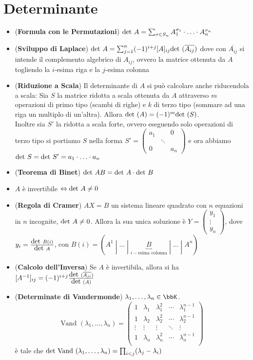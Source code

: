 \documentclass[a4paper,NoNotes,GeneralMath]{stdmdoc}
\newcommand{\Vand}{\mbox{Vand }}
\begin{document}
	\section*{Determinante}
	\begin{itemize}
		\item ({\bf Formula con le Permutazioni}) $\mbox{det } A = \sum_{\sigma \in S_n} A_1^{\sigma_1} \cdot \ldots \cdot A_n^{\sigma_n}$
		\item ({\bf Sviluppo di Laplace}) $\mbox{det } A = \sum_{j=1}^{n} (-1)^{i+j} [A]_{ij} \mbox{det }(\overline{A_{ij}})$ dove con $\overline{A_{ij}}$ si intende il complemento algebrico di $A_{ij}$, ovvero la matrice ottenuta da $A$ togliendo la $i$-esima riga e la $j$-esima colonna
		\item ({\bf Riduzione a Scala}) Il determinante di $A$ si può calcolare anche riducendola a scala: Sia $S$ la matrice ridotta a scala ottenuta da $A$ attraverso $m$ operazioni di primo tipo (scambi di righe) e $k$ di terzo tipo (sommare ad una riga un multiplo di un'altra). Allora $\mbox{det }(A) = (-1)^{m} \mbox{det }(S)$. \\ Inoltre sia $S'$ la ridotta a scala forte, ovvero eseguendo solo operazioni di terzo tipo si portiamo $S$ nella forma $S' = \left( \begin{array}{ccc} a_1 & & 0 \\ & \ddots & \\ 0 & & a_n \end{array} \right)$ e ora abbiamo $\mbox{det } S = \mbox{det } S' = a_1 \cdot \ldots \cdot a_n$
		\item ({\bf Teorema di Binet}) $\mbox{det } AB = \mbox{det } A \cdot \mbox{det } B$
		\item $A$ è invertibile $\Leftrightarrow \mbox{det } A \neq 0$
		\item ({\bf Regola di Cramer}) $AX = B$ un sistema lineare quadrato con $n$ equazioni in $n$ incognite, $\mbox{det } A \neq 0$. Allora la sua unica soluzione è $Y = \left( \begin{array}{c} y_1 \\ \vdots \\ y_n \end{array} \right)$, dove $y_i = \frac{\mbox{det } B(i)}{\mbox{det } A}$, con $B(i) = \left( A^{1} \middle| \ldots \middle| \underbrace{B}_{i-\text{esima colonna}} \middle| \ldots \middle| A^{n} \right)$
		\item ({\bf Calcolo dell'Inversa}) Se $A$ è invertibila, allora si ha $[A^{-1}]_{ij} = (-1)^{i+j} \frac{\mbox{det } (\overline{A_{ji}})}{\mbox{det } (A)}$
		\item ({\bf Determinate di Vandermonde}) $\lambda_1, \ldots, \lambda_n \in \bbK$. $$\Vand(\lambda_1, \ldots, \lambda_n) = \left( \begin{array}{ccccc} 1 & \lambda_1 & \lambda_1^2 & \cdots & \lambda_1^{n-1} \\ 1 & \lambda_2 & \lambda_2^2 & \cdots & \lambda_2^{n-1} \\ \vdots & \vdots & \vdots & \ddots & \vdots \\ 1 & \lambda_n & \lambda_n^2 & \cdots & \lambda_n^{n-1} \\ \end{array} \right)$$ è tale che $\Det \Vand(\lambda_1, \ldots, \lambda_n) = \prod_{i<j} (\lambda_j - \lambda_i)$
	\end{itemize}
	
\end{document}
